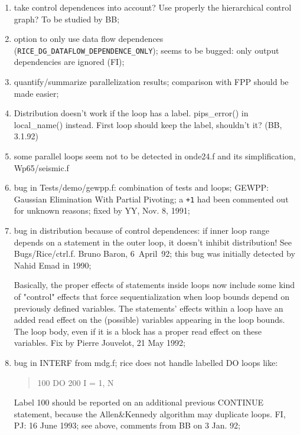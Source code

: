\begin{enumerate}

  \item take control dependences into account? Use properly the hierarchical
        control graph? To be studied by BB;

  \item {} option to only use data flow dependences
        (\verb+RICE_DG_DATAFLOW_DEPENDENCE_ONLY+); seems to be bugged: only
        output dependencies are ignored (FI);

  \item {} 
        quantify/summarize parallelization results; comparison with FPP
        should be made easier;

  \item Distribution doesn't work if the loop has a label. pips\_error()
        in local\_name() instead. First loop should keep the label,
        shouldn't it? (BB, 3.1.92)

  \item some parallel loops seem not to be detected in onde24.f and
        its simplification, Wp65/seismic.f

  \item bug in Tests/demo/gewpp.f: combination of tests and loops; 
        GEWPP: Gaussian Elimination With Partial Pivoting;
        a \verb/+1/ had
        been commented out for unknown reasons; fixed by YY, Nov. 8,
        1991;

  \item bug in distribution because of control dependences: if inner
        loop range depends on a statement in the outer loop, it doesn't
        inhibit distribution! See Bugs/Rice/ctrl.f. Bruno Baron,
        6~April~92; this bug was initially detected by Nahid Emad in 1990;

        Basically, the proper effects of statements inside loops now include
        some kind of "control" effects that force sequentialization when loop
        bounds depend on previously defined variables.  The statements' effects
        within a loop have an added read effect on the (possible) variables
        appearing in the loop bounds. The loop body, even if it is a block has
        a proper read effect on these variables. Fix by Pierre Jouvelot, 21 May
        1992;

  \item bug in INTERF from mdg.f; rice does not handle labelled DO loops
like:
\begin{quote}
100 DO 200 I = 1, N
\end{quote}
Label 100 should be reported on an additional previous CONTINUE
statement, because the Allen\&Kennedy algorithm may duplicate loops.
FI, PJ: 16 June 1993; see above, comments from BB on 3 Jan. 92;

\end{enumerate}

